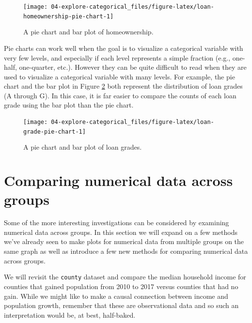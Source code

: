 \documentclass[
  10pt,
  openany]{book}
\begin{document}
\begin{figure}[h]

{\centering \texttt{[image: 04-explore-categorical\_files/figure-latex/loan-homeownership-pie-chart-1]} 

}

\caption{A pie chart and bar plot of homeownership.}\label{fig:loan-homeownership-pie-chart}
\end{figure}

Pie charts can work well when the goal is to visualize a categorical variable with very few levels, and especially if each level represents a simple fraction (e.g., one-half, one-quarter, etc.).
However they can be quite difficult to read when they are used to visualize a categorical variable with many levels.
For example, the pie chart and the bar plot in Figure \ref{fig:loan-grade-pie-chart} both represent the distribution of loan grades (A through G).
In this case, it is far easier to compare the counts of each loan grade using the bar plot than the pie chart.

\begin{figure}[h]

{\centering \texttt{[image: 04-explore-categorical\_files/figure-latex/loan-grade-pie-chart-1]} 

}

\caption{A pie chart and bar plot of loan grades.}\label{fig:loan-grade-pie-chart}
\end{figure}

\hypertarget{comparing-numerical-data-across-groups}{%
\section{Comparing numerical data across groups}\label{comparing-numerical-data-across-groups}}

Some of the more interesting investigations can be considered by examining numerical data across groups.
In this section we will expand on a few methods we've already seen to make plots for numerical data from multiple groups on the same graph as well as introduce a few new methods for comparing numerical data across groups.

We will revisit the \texttt{county} dataset and compare the median household income for counties that gained population from 2010 to 2017 versus counties that had no gain.
While we might like to make a causal connection between income and population growth, remember that these are observational data and so such an interpretation would be, at best, half-baked.
\end{document}
